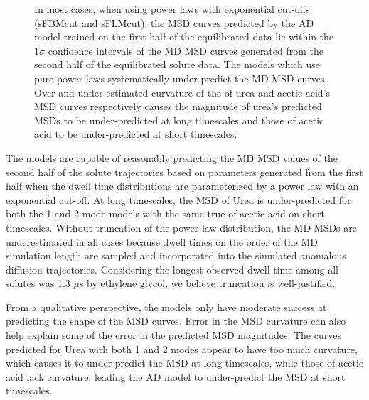 \documentclass{article}
\begin{document}
\begin{figure}
  \caption{In most cases, when using power laws with exponential cut-offs 
  (sFBMcut and sFLMcut), the MSD curves predicted by the AD model trained on 
  the first half of the equilibrated data lie within the 1$\sigma$ confidence
  intervals of the MD MSD curves generated from the second half of the equilibrated
  solute data. The models which use pure power laws systematically under-predict
  the MD MSD curves. Over and under-estimated curvature of the of urea and acetic acid's 
  MSD curves respectively causes the magnitude of urea's predicted MSDs to be 
  under-predicted at long timescales and those of acetic acid to be under-predicted
  at short timescales.}\label{fig:train_test}
  \end{figure}
  
  The models are capable of reasonably predicting the MD MSD values of the second
  half of the solute trajectories based on parameters generated from the first half
  when the dwell time distributions are parameterized by a power law with an 
  exponential cut-off. At long timescales, the MSD of Urea is under-predicted 
  for both the 1 and 2 mode models with the same true of acetic acid on short 
  timescales. Without truncation of the power law distribution, the MD 
  MSDs are underestimated in all cases because dwell times on the order of the
  MD simulation length are sampled and incorporated into the simulated anomalous
  diffusion trajectories. Considering the longest observed dwell time among all
  solutes was 1.3 $\mu$s by ethylene glycol, we believe truncation is well-justified.
  
  
  From a qualitative perspective, the models only have moderate success at predicting
  the shape of the MSD curves. Error in the MSD curvature can also help explain some of
  the error in the predicted MSD magnitudes. The curves predicted for Urea with both 1 
  and 2 modes appear to have too much curvature, which causes it to under-predict the 
  MSD at long timescales, while those of acetic acid lack curvature, leading the
  AD model to under-predict the MSD at short timescales. 
  
\end{document}
